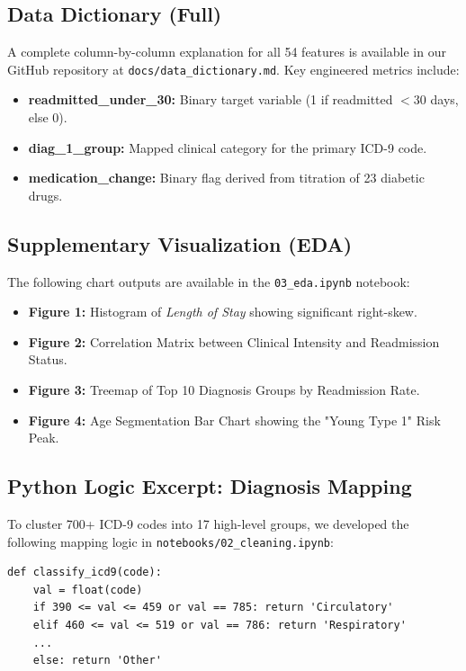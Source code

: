 \documentclass[12pt,a4paper]{article}
\begin{document}
\subsection{Data Dictionary (Full)}
A complete column-by-column explanation for all 54 features is available in our GitHub repository at \texttt{docs/data\_dictionary.md}. Key engineered metrics include:
\begin{itemize}
    \item \textbf{readmitted\_under\_30:} Binary target variable (1 if readmitted $<30$ days, else 0).
    \item \textbf{diag\_1\_group:} Mapped clinical category for the primary ICD-9 code.
    \item \textbf{medication\_change:} Binary flag derived from titration of 23 diabetic drugs.
\end{itemize}

\subsection{Supplementary Visualization (EDA)}
The following chart outputs are available in the \texttt{03\_eda.ipynb} notebook:
\begin{itemize}
    \item \textbf{Figure 1:} Histogram of \textit{Length of Stay} showing significant right-skew.
    \item \textbf{Figure 2:} Correlation Matrix between Clinical Intensity and Readmission Status.
    \item \textbf{Figure 3:} Treemap of Top 10 Diagnosis Groups by Readmission Rate.
    \item \textbf{Figure 4:} Age Segmentation Bar Chart showing the "Young Type 1" Risk Peak.
\end{itemize}

\subsection{Python Logic Excerpt: Diagnosis Mapping}
To cluster 700+ ICD-9 codes into 17 high-level groups, we developed the following mapping logic in \texttt{notebooks/02_cleaning.ipynb}:
\begin{verbatim}
def classify_icd9(code):
    val = float(code)
    if 390 <= val <= 459 or val == 785: return 'Circulatory'
    elif 460 <= val <= 519 or val == 786: return 'Respiratory'
    ...
    else: return 'Other'
\end{verbatim}
\end{document}

